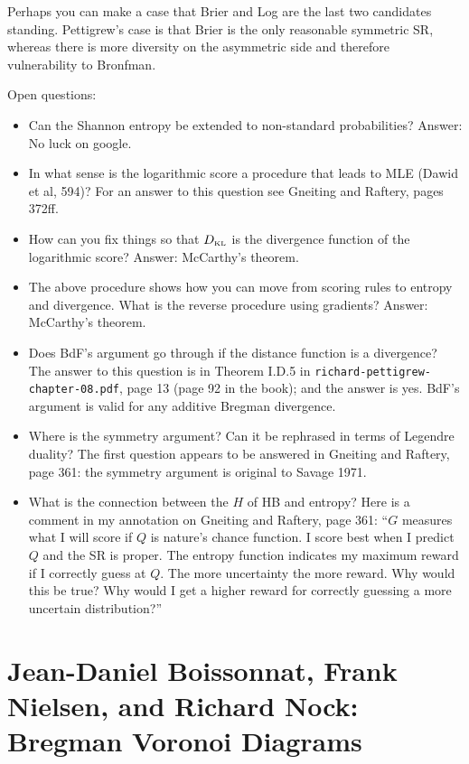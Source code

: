 \documentclass[12pt]{article}
\begin{document}
Perhaps you can make a case that Brier and Log are the last two
candidates standing. Pettigrew's case is that Brier is the only
reasonable symmetric SR, whereas there is more diversity on the
asymmetric side and therefore vulnerability to Bronfman.

Open questions:

\begin{itemize}
\item Can the Shannon entropy be extended to non-standard
  probabilities? Answer: No luck on google.

\item In what sense is the logarithmic score a procedure that leads to
  MLE (Dawid et al, 594)? For an answer to this question see Gneiting
  and Raftery, pages 372ff.
\item How can you fix things so that $D_{\mbox{\tiny KL}}$ is the
  divergence function of the logarithmic score? Answer:
  McCarthy's theorem.
\item The above procedure shows how you can move from scoring rules to
  entropy and divergence. What is the reverse procedure using
  gradients? Answer: McCarthy's theorem.
\item Does BdF's argument go through if the distance function is a
  divergence? The answer to this question is in Theorem I.D.5 in
  \texttt{richard-pettigrew-chapter-08.pdf}, page 13 (page 92 in the
  book); and the answer is yes. BdF's argument is valid for any
  additive Bregman divergence.
\item Where is the symmetry argument? Can it be rephrased in terms of
  Legendre duality? The first question appears to be answered in
  Gneiting and Raftery, page 361: the symmetry argument is original to
  Savage 1971.
\item What is the connection between the $H$ of HB and entropy? Here
  is a comment in my annotation on Gneiting and Raftery, page 361: ``$G$
  measures what I will score if $Q$ is nature's chance function. I score
  best when I predict $Q$ and the SR is proper. The entropy function
  indicates my maximum reward if I correctly guess at $Q$. The more
  uncertainty the more reward. Why would this be true? Why would I get
  a higher reward for correctly guessing a more uncertain
  distribution?''
\end{itemize}

\section{Jean-Daniel Boissonnat, Frank Nielsen, and Richard Nock:
  Bregman Voronoi Diagrams}
\label{section:enateegh}
\end{document}
